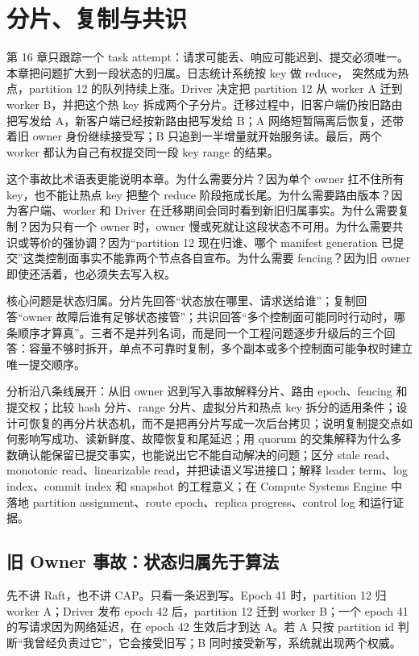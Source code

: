 \chapter{分片、复制与共识}

第 16 章只跟踪一个 task attempt：请求可能丢、响应可能迟到、提交必须唯一。本章把问题扩大到一段状态的归属。日志统计系统按 key 做 reduce， 突然成为热点，partition 12 的队列持续上涨。Driver 决定把 partition 12 从 worker A 迁到 worker B，并把这个热 key 拆成两个子分片。迁移过程中，旧客户端仍按旧路由把写发给 A，新客户端已经按新路由把写发给 B；A 网络短暂隔离后恢复，还带着旧 owner 身份继续接受写；B 只追到一半增量就开始服务读。最后，两个 worker 都认为自己有权提交同一段 key range 的结果。

这个事故比术语表更能说明本章。为什么需要分片？因为单个 owner 扛不住所有 key，也不能让热点 key 把整个 reduce 阶段拖成长尾。为什么需要路由版本？因为客户端、worker 和 Driver 在迁移期间会同时看到新旧归属事实。为什么需要复制？因为只有一个 owner 时，owner 慢或死就让这段状态不可用。为什么需要共识或等价的强协调？因为“partition 12 现在归谁、哪个 manifest generation 已提交”这类控制面事实不能靠两个节点各自宣布。为什么需要 fencing？因为旧 owner 即使还活着，也必须失去写入权。

核心问题是状态归属。分片先回答“状态放在哪里、请求送给谁”；复制回答“owner 故障后谁有足够状态接管”；共识回答“多个控制面可能同时行动时，哪条顺序才算真”。三者不是并列名词，而是同一个工程问题逐步升级后的三个回答：容量不够时拆开，单点不可靠时复制，多个副本或多个控制面可能争权时建立唯一提交顺序。

分析沿八条线展开：从旧 owner 迟到写入事故解释分片、路由 epoch、fencing 和提交权；比较 hash 分片、range 分片、虚拟分片和热点 key 拆分的适用条件；设计可恢复的再分片状态机，而不是把再分片写成一次后台拷贝；说明复制提交点如何影响写成功、读新鲜度、故障恢复和尾延迟；用 quorum 的交集解释为什么多数确认能保留已提交事实，也能说出它不能自动解决的问题；区分 stale read、monotonic read、linearizable read，并把读语义写进接口；解释 leader term、log index、commit index 和 snapshot 的工程意义；在 Compute Systems Engine 中落地 partition assignment、route epoch、replica progress、control log 和运行证据。

\section{旧 Owner 事故：状态归属先于算法}

先不讲 Raft，也不讲 CAP。只看一条迟到写。Epoch 41 时，partition 12 归 worker A；Driver 发布 epoch 42 后，partition 12 迁到 worker B；一个 epoch 41 的写请求因为网络延迟，在 epoch 42 生效后才到达 A。若 A 只按 partition id 判断“我曾经负责过它”，它会接受旧写；B 同时接受新写，系统就出现两个权威。

